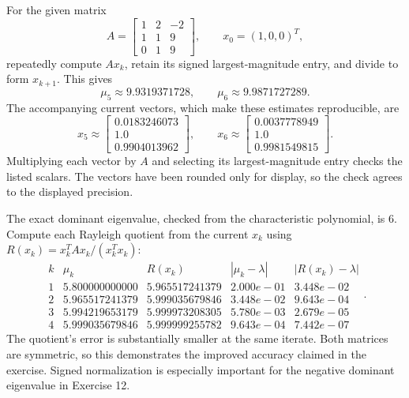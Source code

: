 For the given matrix
\[A=\left[\begin{matrix}1 & 2 & -2\\1 & 1 & 9\\0 & 1 & 9\end{matrix}\right],\qquad x_0=(1,0,0)^T,\]
repeatedly compute $Ax_k$, retain its signed largest-magnitude entry,
and divide to form $x_{k+1}$. This gives
\[\mu_5\approx9.9319371728,\qquad
\mu_6\approx9.9871727289.\]
The accompanying current vectors, which make these estimates reproducible,
are
\[x_5\approx\left[\begin{matrix}0.0183246073\\1.0\\0.9904013962\end{matrix}\right],\qquad
x_6\approx\left[\begin{matrix}0.0037778949\\1.0\\0.9981549815\end{matrix}\right].\]
Multiplying each vector by $A$ and selecting its largest-magnitude
entry checks the listed scalars. The vectors have been rounded only
for display, so the check agrees to the displayed precision.

The exact dominant eigenvalue, checked from the characteristic
polynomial, is $6$. Compute each Rayleigh quotient
from the current $x_k$ using $R(x_k)=x_k^TAx_k/(x_k^Tx_k)$:
\[\begin{array}{c|rr|rr}
k&\mu_k&R(x_k)&|\mu_k-\lambda|&|R(x_k)-\lambda|\\\hline
1&5.800000000000&5.965517241379&2.000e-01&3.448e-02\\
2&5.965517241379&5.999035679846&3.448e-02&9.643e-04\\
3&5.994219653179&5.999973208305&5.780e-03&2.679e-05\\
4&5.999035679846&5.999999255782&9.643e-04&7.442e-07\end{array}.\]
The quotient's error is substantially smaller at the same iterate.
Both matrices are symmetric, so this demonstrates the improved
accuracy claimed in the exercise. Signed normalization is especially
important for the negative dominant eigenvalue in Exercise 12.

